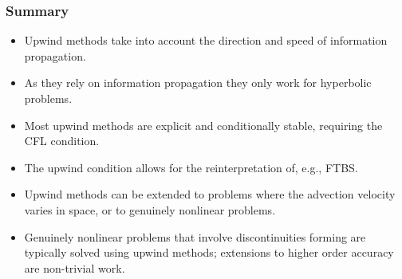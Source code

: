 \documentclass{beamer}
\begin{document}
\begin{frame}
  \frametitle{Summary}

  \begin{itemize}
  \item Upwind methods take into account the direction and speed of
    information propagation.
  \item As they rely on information propagation they only work for
    hyperbolic problems.
  \item Most upwind methods are explicit and conditionally stable,
    requiring the CFL condition.
  \item The upwind condition allows for the reinterpretation of, e.g.,
    FTBS.
  \item Upwind methods can be extended to problems where the advection
    velocity varies in space, or to genuinely nonlinear problems.
  \item Genuinely nonlinear problems that involve discontinuities
    forming are typically solved using upwind methods; extensions to
    higher order accuracy are non-trivial work.
  \end{itemize}

\end{frame}
\end{document}
